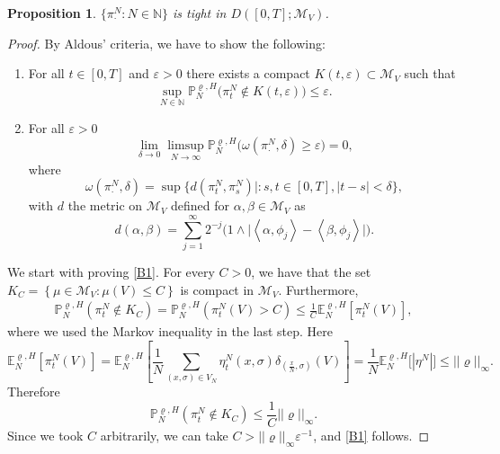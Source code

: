 \documentclass[11pt]{article}
\numberwithin{equation}{section}
\theoremstyle{definition}
\theoremstyle{plain}
\newtheorem{Proposition}[Theorem]{Proposition}
\newcommand{\E}{\mathbb{E}}
\newcommand{\p}{\mathbb{P}}
\begin{document}
\begin{Proposition}
    $\{\pi^N_{\cdot}:N\in\mathbb{N}\}$ is tight in $D([0,T];\mathcal{M}_V)$.
\end{Proposition}
\begin{proof}
    By Aldous' criteria, we have to show the following:
\begin{enumerate}[label=\textbf{B.\arabic*}]
\item \label{B1}For all $t\in[0,T]$ and $\varepsilon>0$ there exists a compact $K(t, \varepsilon) \subset \mathcal{M}_V$ such that 
    \begin{equation}
        \sup_{N\in \mathbb{N}} \p^{\varrho,H}_N\big(\pi^N_{t}\notin K(t,\varepsilon)\big) \leq \varepsilon.
    \end{equation}
\item \label{B2} For all $\varepsilon>0$
    \begin{equation}
        \lim_{\delta \to 0} \limsup_{N\to\infty} \p^{\varrho,H}_N\big(\omega(\pi^N_{\cdot},\delta)\geq \varepsilon\big) = 0,
    \end{equation}
where
    \begin{equation}
        \omega(\pi^N_{\cdot}, \delta) =\sup\{d(\pi^N_{t},\pi^N_{s})| : s,t \in [0,T], |t-s|<\delta\},
    \end{equation}
with $d$ the metric on $\mathcal{M}_V$ defined for $\alpha,\beta \in \mathcal{M}_V$ as  
    \begin{equation}
        d(\alpha,\beta) = \sum_{j=1}^\infty 2^{-j}\Big(1\wedge \big|\left<\alpha,\phi_j\right> - \left<\beta,\phi_j\right>\big|\Big).
    \end{equation}
\end{enumerate}  
We start with proving \ref{B1}. For every $C>0$, we have that the set 
$K_C = \left\{ \mu \in \mathcal{M}_V: \mu(V)\leq C\right\}$
is compact in $\mathcal{M}_V$. Furthermore,
    \begin{align}
        \p^{\varrho,H}_N(\pi^N_{t} \notin K_C) = \p^{\varrho,H}_N(\pi^N_{t}(V) > C) \leq \frac{1}{C} \E^{\varrho,H}_N[\pi^N_{t}(V)],
    \end{align}
where we used the Markov inequality in the last step. Here 
    \begin{equation}
        \E^{\varrho,H}_N[\pi^N_{t}(V)] = \E^{\varrho,H}_N\left[\frac{1}{N}\sum_{(x,\sigma) \in V_N} \eta_t^N(x,\sigma) \delta_{(\tfrac{x}{N},\sigma)}(V)\right] = \frac{1}{N} \E^{\varrho,H}_N\big[|\eta^N|\big] \leq ||\varrho||_\infty.
    \end{equation}
Therefore 
    \begin{equation}
        \p^{\varrho,H}_N(\pi^N_{t} \notin K_C) \leq \frac{1}{C} ||\varrho||_\infty.
    \end{equation}
Since we took $C$ arbitrarily, we can take $C>||\varrho||_\infty \varepsilon^{-1}$, and \ref{B1} follows. 


\end{proof}
\end{document}
